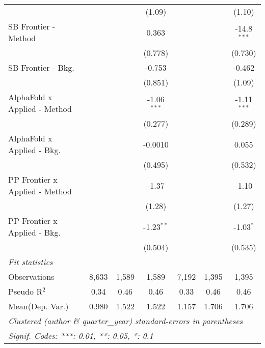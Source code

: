 \begin{tabular}{lcccccc}
                                  &                &                & (1.09)        &               &                & (1.10)\\   
   SB Frontier - Method           &                &                & 0.363         &               &                & -14.8$^{***}$\\   
                                  &                &                & (0.778)       &               &                & (0.730)\\   
   SB Frontier - Bkg.             &                &                & -0.753        &               &                & -0.462\\   
                                  &                &                & (0.851)       &               &                & (1.09)\\   
   AlphaFold x Applied - Method   &                &                & -1.06$^{***}$ &               &                & -1.11$^{***}$\\   
                                  &                &                & (0.277)       &               &                & (0.289)\\   
   AlphaFold x Applied - Bkg.     &                &                & -0.0010       &               &                & 0.055\\   
                                  &                &                & (0.495)       &               &                & (0.532)\\   
   PP Frontier x Applied - Method &                &                & -1.37         &               &                & -1.10\\   
                                  &                &                & (1.28)        &               &                & (1.27)\\   
   PP Frontier x Applied - Bkg.   &                &                & -1.23$^{**}$  &               &                & -1.03$^{*}$\\   
                                  &                &                & (0.504)       &               &                & (0.535)\\   
   \midrule
   \emph{Fit statistics}\\
   Observations                   & 8,633          & 1,589          & 1,589         & 7,192         & 1,395          & 1,395\\  
   Pseudo R$^2$                   & 0.34           & 0.46           & 0.46          & 0.33          & 0.46           & 0.46\\  
Mean(Dep. Var.) & 0.980 & 1.522 & 1.522 & 1.157 & 1.706 & 1.706 \\
   \midrule \midrule
   \multicolumn{7}{l}{\emph{Clustered (author \& quarter\_year) standard-errors in parentheses}}\\
   \multicolumn{7}{l}{\emph{Signif. Codes: ***: 0.01, **: 0.05, *: 0.1}}\\
\end{tabular}
\par\endgroup
